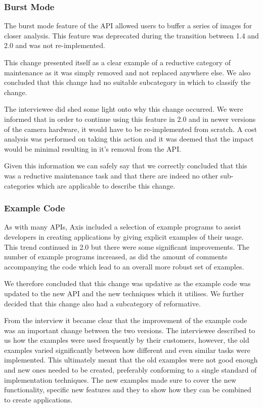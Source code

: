 \documentclass{sig-alternate}
\begin{document}
\subsubsection{Burst Mode}

The burst mode feature of the API allowed users to buffer a series of images for closer analysis. This feature was deprecated during the transition between 1.4 and 2.0 and was not re-implemented.

This change presented itself as a clear example of a reductive category of maintenance as it was simply removed and not replaced anywhere else. We also concluded that this change had no suitable subcategory in which to classify the change.

The interviewee did shed some light onto why this change occurred. We were informed that in order to continue using this feature in 2.0 and in newer versions of the camera hardware, it would have to be re-implemented from scratch. A cost analysis was performed on taking this action and it was deemed that the impact would be minimal resulting in it's removal from the API.

Given this information we can safely say that we correctly concluded that this was a reductive maintenance task and that there are indeed no other sub-categories which are applicable to describe this change.


\subsubsection{Example Code}

As with many APIs, Axis included a selection of example programs to assist developers in creating applications by giving explicit examples of their usage. This trend continued in 2.0 but there were some significant improvements. The number of example programs increased, as did the amount of comments accompanying the code which lead to an overall more robust set of examples.

We therefore concluded that this change was updative as the example code was updated to the new API and the new techniques which it utilises. We further decided that this change also had a subcategory of reformative.

From the interview it became clear that the improvement of the example code was an important change between the two versions. The interviewee described to us how the examples were used frequently by their customers, however, the old examples varied significantly between how different and even similar tasks were implemented. This ultimately meant that the old examples were not good enough and new ones needed to be created, preferably conforming to a single standard of implementation techniques. The new examples made sure to cover the new functionality, specific new features and they to show how they can be combined to create applications.
\end{document}
